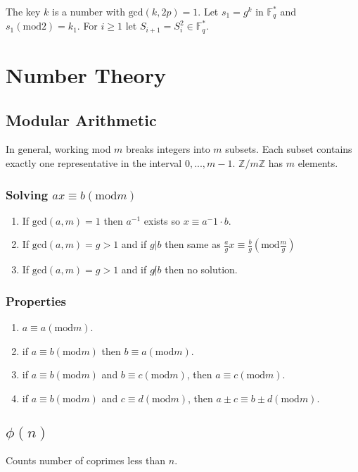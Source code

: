 \documentclass{article}
\begin{document}
The key $k$ is a number with $\text{gcd}(k,2p)=1$. Let $s_1=g^k$ in
$\mathbb{F}_q^*$ and $s_1 (\text{mod} 2) = k_1$. For $i \geq 1$ let
$S_{i+1}=S_i^2 \in \mathbb{F}_q^*$.

\section{Number Theory}

\subsection{Modular Arithmetic}
In general, working mod $m$ breaks integers into $m$ subsets. Each subset
contains exactly one representative in the interval $0,...,m-1$.
$\mathbb{Z}/m\mathbb{Z}$ has $m$ elements.

\subsubsection{Solving $ax \equiv b (\text{mod} m)$}
\begin{enumerate}
  \item If $\text{gcd}(a,m) = 1$ then $a^{-1}$ exists so
    $x\equiv a^-1 \cdot b$.
  \item If $\text{gcd}(a,m) = g > 1$ and if $g | b$ then same as
    $\frac{a}{g}x\equiv\frac{b}{g} (\text{mod} \frac{m}{g})$
  \item If $\text{gcd}(a,m) = g > 1$ and if $g \not| b$ then no solution.
\end{enumerate}

\subsubsection{Properties}
\begin{enumerate}
  \item $a \equiv a (\text{mod} m)$.
  \item if $a \equiv b (\text{mod} m)$ then $b \equiv a (\text{mod} m)$.
  \item if $a \equiv b (\text{mod} m)$ and $b \equiv c (\text{mod} m)$, then
    $a \equiv c (\text{mod} m)$.
  \item if $a \equiv b (\text{mod} m)$ and $c \equiv d (\text{mod} m)$, then
    $a \pm c \equiv b \pm d (\text{mod} m)$.
\end{enumerate}

\subsection{$\phi(n)$}
Counts number of coprimes less than $n$.
\end{document}
